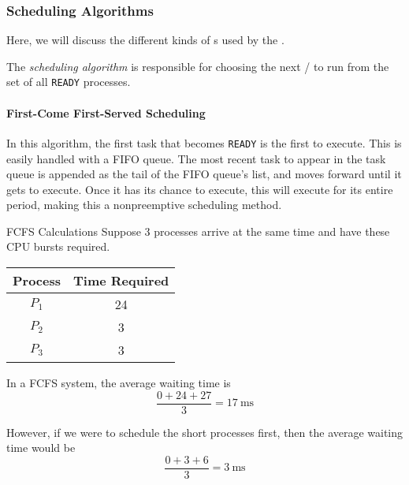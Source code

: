 \subsubsection{Scheduling Algorithms}\label{subsubsec:Scheduling_Algorithms}
Here, we will discuss the different kinds of s used by the .

\begin{definition}\label{def:Scheduling_Algorithm}
  The \emph{scheduling algorithm} is responsible for choosing the next / to run from the set of all \texttt{READY} processes.
\end{definition}

\paragraph{First-Come First-Served Scheduling}\label{par:FCFS_Scheduling}
In this algorithm, the first task that becomes \texttt{READY} is the first to execute.
This is easily handled with a FIFO queue.
The most recent task to appear in the task queue is appended as the tail of the FIFO queue's list, and moves forward until it gets to execute.
Once it has its chance to execute, this  will execute for its entire period, making this a nonpreemptive scheduling method.


\begin{example}[]{FCFS Calculations}
  Suppose 3 processes arrive at the same time and have these CPU bursts required.
  \begin{center}
    \begin{tabular}{cc}
      \toprule
      Process & Time Required \\
      \midrule
      $P_{1}$ & 24 \\
      $P_{2}$ & 3 \\
      $P_{3}$ & 3 \\
      \bottomrule
    \end{tabular}
  \end{center}
  \tcblower{}
  In a FCFS system, the average waiting time is
  \begin{equation*}
    \frac{0+24+27}{3} = \SI{17}{\milli \second}
  \end{equation*}

  However, if we were to schedule the short processes first, then the average waiting time would be
  \begin{equation*}
    \frac{0+3+6}{3} = \SI{3}{\milli \second}
  \end{equation*}
\end{example}

